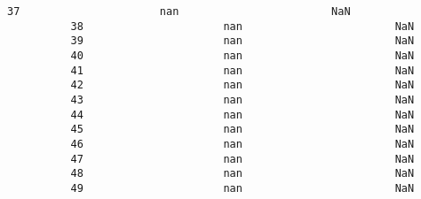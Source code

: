 \documentclass[11pt]{article}
\begin{document}
\begin{Verbatim}[commandchars=\\\{\}]
          37                      nan                        NaN   
          38                      nan                        NaN   
          39                      nan                        NaN   
          40                      nan                        NaN   
          41                      nan                        NaN   
          42                      nan                        NaN   
          43                      nan                        NaN   
          44                      nan                        NaN   
          45                      nan                        NaN   
          46                      nan                        NaN   
          47                      nan                        NaN   
          48                      nan                        NaN   
          49                      nan                        NaN   
          

\end{Verbatim}
\end{document}
